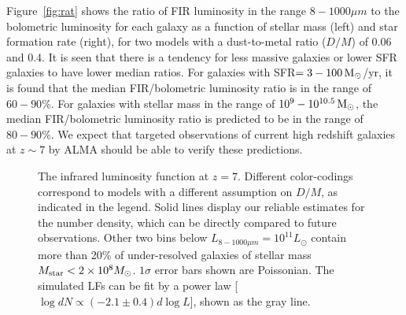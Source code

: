 Figure~\ref{fig:rat} shows the ratio of FIR luminosity in the range $8-1000\mu m$ to the bolometric luminosity 
for each galaxy as a function of stellar mass (left) and star formation rate (right), 
for two models  with a dust-to-metal ratio ($D/M$) of 0.06 and 0.4.
It is seen that there is a tendency for less massive galaxies or lower SFR galaxies to have lower median ratios.
For galaxies with SFR$=3-100{\rm\,M_\odot}$/yr, it is found that the median FIR/bolometric luminosity ratio is in the range of $60-90\%$.
For galaxies with stellar mass in the range of $10^9-10^{10.5}{\rm\,M_\odot}$, 
the median FIR/bolometric luminosity ratio is predicted to be in the range of $80-90\%$.
We expect that targeted observations of current high redshift galaxies at $z\sim 7$
by ALMA should be able to verify these predictions.



\begin{figure}[!ht]
\centering
\vskip 1cm
\vskip -0cm
\caption{%
The infrared luminosity function at $z=7$. Different color-codings correspond to models with
   a different assumption on $D/M$, as indicated in the legend. Solid lines display our reliable estimates for the number
   density, which can be directly compared to future observations. Other two bins below
   $ L_{8-1000\mu m} = 10^{11} L_\odot$ contain more than 20\% of under-resolved galaxies of stellar mass
   $M_{\rm star} < 2\times10^8 M_\odot$.  
$1\sigma$ error bars shown are Poissonian. 
The simulated LFs can be fit by a power law [$\log dN \propto (-2.1\pm0.4)d\log L$], shown as the gray line.
}
\label{fig:IRLF}
\end{figure}


